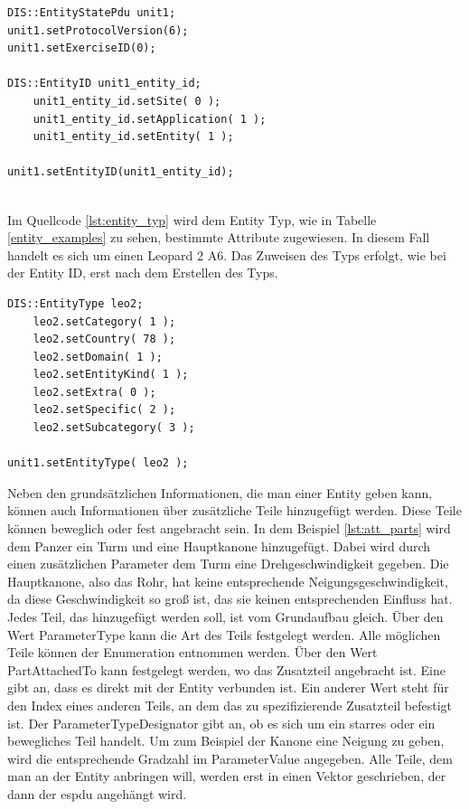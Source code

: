 \begin{lstlisting}[caption=Unit Header,label={lst:unitheader}]
DIS::EntityStatePdu unit1;
unit1.setProtocolVersion(6);
unit1.setExerciseID(0);
  
DIS::EntityID unit1_entity_id;
	unit1_entity_id.setSite( 0 );
	unit1_entity_id.setApplication( 1 );
	unit1_entity_id.setEntity( 1 );
  
unit1.setEntityID(unit1_entity_id);
  
\end{lstlisting}
Im Quellcode \ref{lst:entity_typ} wird dem Entity Typ, wie in Tabelle \ref{entity_examples} zu sehen, bestimmte Attribute zugewiesen. In diesem Fall handelt es sich um einen Leopard 2 A6.
Das Zuweisen des Typs erfolgt, wie bei der Entity ID, erst nach dem Erstellen des Typs. 
\begin{lstlisting}[caption=Entity Typ,label={lst:entity_typ}]
DIS::EntityType leo2;
	leo2.setCategory( 1 );
	leo2.setCountry( 78 );
	leo2.setDomain( 1 );
	leo2.setEntityKind( 1 );
	leo2.setExtra( 0 );
	leo2.setSpecific( 2 );
	leo2.setSubcategory( 3 );

unit1.setEntityType( leo2 );
\end{lstlisting}
Neben den grundsätzlichen Informationen, die man einer Entity geben kann, können auch Informationen über zusätzliche Teile hinzugefügt werden. Diese Teile können beweglich oder fest angebracht sein. 
In dem Beispiel  \ref{lst:att_parts} wird dem  Panzer ein Turm und eine Hauptkanone hinzugefügt. Dabei wird durch einen zusätzlichen Parameter dem Turm eine Drehgeschwindigkeit gegeben. Die Hauptkanone, also das Rohr, hat keine entsprechende Neigungsgeschwindigkeit, da diese Geschwindigkeit so groß ist, das sie keinen entsprechenden Einfluss hat.
Jedes Teil, das hinzugefügt werden soll, ist vom Grundaufbau gleich. Über den Wert \glqq ParameterType \grqq{} kann die Art des Teils festgelegt werden. Alle möglichen Teile können  der \glqq Enumeration\grqq{} entnommen werden. Über den Wert \glqq{}  PartAttachedTo\grqq{} kann festgelegt werden, wo das Zusatzteil angebracht ist. Eine \grqq{} gibt an, dass es direkt mit der Entity verbunden ist. Ein anderer Wert steht für den Index eines anderen Teils, an dem das zu spezifizierende Zusatzteil befestigt ist. Der  \glqq ParameterTypeDesignator\grqq{} gibt an, ob es sich um ein starres oder ein bewegliches Teil handelt. Um zum Beispiel der Kanone  eine Neigung zu geben, wird die entsprechende Gradzahl im  \glqq ParameterValue\grqq{} angegeben.
Alle Teile, dem man an der Entity anbringen will, werden erst in einen Vektor geschrieben, der dann der \ac{espdu}  angehängt wird.
 
